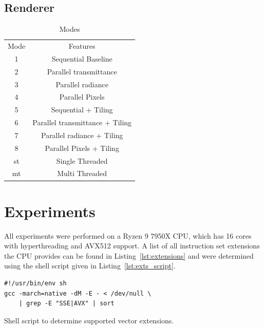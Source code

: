 \documentclass[a4paper, 11pt]{memoir}
\begin{document}
    \section{Renderer}
    \label{sec:renderer}
    \begin{table}[b]
        \centering
        \begin{tabular}{|c|c|}
            \hline
            Mode & Features\\
            1    & Sequential Baseline\\
            2    & Parallel \gls{transmittance}\\
            3    & Parallel \gls{radiance}\\
            4    & Parallel Pixels\\
            5    & Sequential + Tiling\\
            6    & Parallel \gls{transmittance} + Tiling\\
            7    & Parallel \gls{radiance} + Tiling\\
            8    & Parallel Pixels + Tiling\\
            st   & Single Threaded\\
            mt   & Multi Threaded\\
            \hline
        \end{tabular}
        \caption{Modes}
        \label{tab:exec_modes}
    \end{table}
    
    \chapter{Experiments}
    \label{ch:experiments}
    
    All experiments were performed on a Ryzen 9 7950X CPU, which has 16 cores with hyperthreading and AVX512 support.
    A list of all instruction set extensions the CPU provides can be found in Listing~\ref{lst:extensions} and were determined
    using the shell script given in Listing~\ref{lst:exts_script}.
    \begin{listing}[H]
        \begin{verbatim}
#!/usr/bin/env sh
gcc -march=native -dM -E - < /dev/null \
    | grep -E "SSE|AVX" | sort
        \end{verbatim}
        \caption{Shell script to determine supported vector extensions.}
        \label{lst:exts_script}
    \end{listing}
\end{document}
